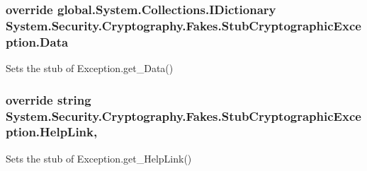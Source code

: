 \hypertarget{class_system_1_1_security_1_1_cryptography_1_1_fakes_1_1_stub_cryptographic_exception_aa15af8d688d2f8b6b2d551b70df9b1a1}{
\subsubsection[{Data}]{\setlength{\rightskip}{0pt plus 5cm}override global.\-System.\-Collections.\-I\-Dictionary System.\-Security.\-Cryptography.\-Fakes.\-Stub\-Cryptographic\-Exception.\-Data\hspace{0.3cm}{\ttfamily [get]}}}\label{class_system_1_1_security_1_1_cryptography_1_1_fakes_1_1_stub_cryptographic_exception_aa15af8d688d2f8b6b2d551b70df9b1a1}


Sets the stub of Exception.\-get\-\_\-\-Data()

\hypertarget{class_system_1_1_security_1_1_cryptography_1_1_fakes_1_1_stub_cryptographic_exception_aa941e97d3c3b9298c53effb2800e33dc}{
\subsubsection[{Help\-Link}]{\setlength{\rightskip}{0pt plus 5cm}override string System.\-Security.\-Cryptography.\-Fakes.\-Stub\-Cryptographic\-Exception.\-Help\-Link\hspace{0.3cm}{\ttfamily [get]}, {\ttfamily [set]}}}\label{class_system_1_1_security_1_1_cryptography_1_1_fakes_1_1_stub_cryptographic_exception_aa941e97d3c3b9298c53effb2800e33dc}


Sets the stub of Exception.\-get\-\_\-\-Help\-Link()

